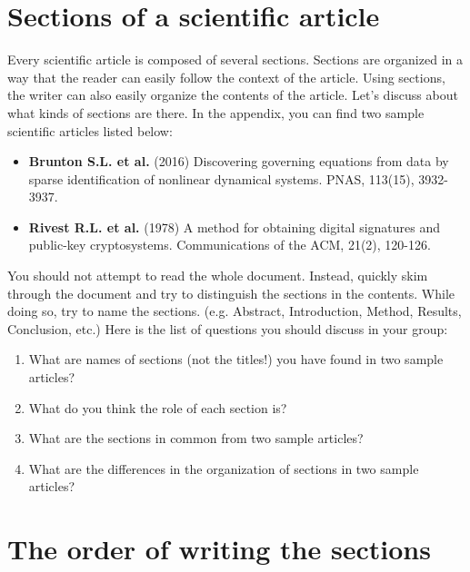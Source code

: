 \documentclass{article}
\begin{document}
\newpage
\section{Sections of a scientific article}

Every scientific article is composed of several sections.
Sections are organized in a way that the reader can easily follow the context of the article.
Using sections, the writer can also easily organize the contents of the article.
Let's discuss about what kinds of sections are there.
In the appendix, you can find two sample scientific articles listed below:
\begin{itemize}
    \item \textbf{Brunton S.L. et al.} (2016) Discovering governing equations from data by sparse identification of nonlinear dynamical systems. PNAS, 113(15), 3932-3937.
    \item \textbf{Rivest R.L. et al.} (1978) A method for obtaining digital signatures and public-key cryptosystems. Communications of the ACM, 21(2), 120-126.
\end{itemize}
You should not attempt to read the whole document.
Instead, quickly skim through the document and try to distinguish the sections in the contents.
While doing so, try to name the sections. (e.g. Abstract, Introduction, Method, Results, Conclusion, etc.) 
Here is the list of questions you should discuss in your group:
\begin{enumerate}
    \item What are names of sections (not the titles!) you have found in two sample articles? 
    \vspace{2in}
    \item What do you think the role of each section is?
    \vspace{2in}
    \item What are the sections in common from two sample articles?
    \vspace{2in}
    \item What are the differences in the organization of sections in two sample articles?
    \vspace{2in}
\end{enumerate}


\newpage
\section{The order of writing the sections}
\end{document}
